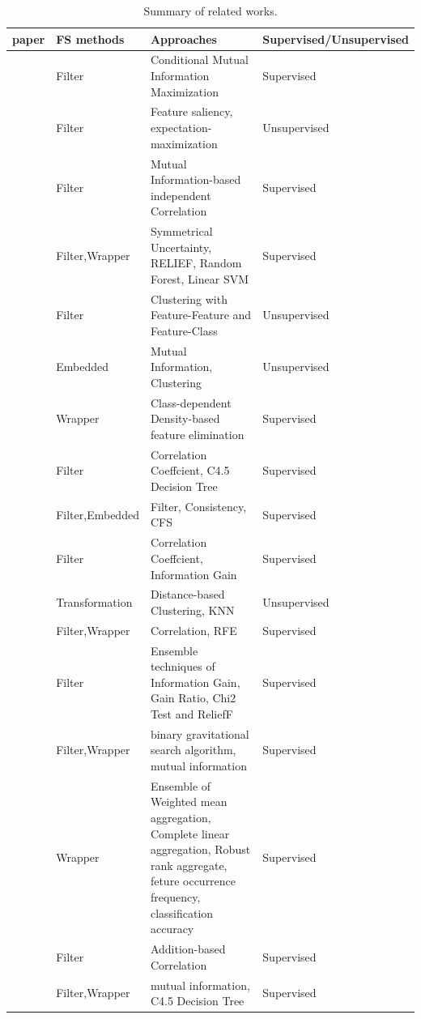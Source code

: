 \documentclass{ieeeaccess}
\theoremstyle{definition}
\begin{document}
\begin{table}[!htbp]
    \centering
    \caption{Summary of related works.}
        \begin{tabular}{p{3em}p{8em}p{20em}p{11em}}
        \toprule
        paper & FS methods & Approaches & Supervised/Unsupervised \\
        \midrule
        \cite{Fleuret2004} & Filter & Conditional Mutual Information Maximization & Supervised \\
        \cite{Law2004} & Filter & Feature saliency, expectation-maximization & Unsupervised \\
        \cite{Qu2005} & Filter & Mutual Information-based independent Correlation & Supervised \\
        \cite{Saeys2008} & Filter,\newline{}Wrapper & Symmetrical Uncertainty, RELIEF, Random Forest, Linear SVM & Supervised \\
        \cite{Hsu2010} & Filter & Clustering with Feature-Feature and Feature-Class & Unsupervised \\
        \cite{Liu2011} & Embedded & Mutual Information, Clustering & Unsupervised \\
        \cite{Javed2012} & Wrapper & Class-dependent Density-based feature elimination & Supervised \\
        \cite{Eid2013} & Filter & Correlation Coeffcient, C4.5 Decision Tree & Supervised \\
        \cite{Singh2015} & Filter,\newline{}Embedded & Filter, Consistency, CFS  & Supervised \\
        \cite{Wahba2015} & Filter & Correlation Coeffcient, Information Gain & Supervised \\
        \cite{CANN2015} & Transformation & Distance-based Clustering, KNN & Unsupervised \\
        \cite{Iglesias2015} & Filter,\newline{}Wrapper & Correlation, RFE & Supervised \\
        \cite{Osanaiye2016} & Filter & Ensemble techniques of Information Gain, Gain Ratio, Chi2 Test and ReliefF & Supervised \\
        \cite{Bostani2017} & Filter,\newline{}Wrapper & binary gravitational search algorithm, mutual information & Supervised \\
        \cite{Brahim2018} & Wrapper & Ensemble of Weighted mean aggregation, Complete linear aggregation, Robust rank aggregate, feture occurrence frequency, classification accuracy & Supervised \\
        \cite{CorrCorr2019} & Filter & Addition-based Correlation & Supervised \\
        \cite{Selvakumar2019} & Filter,\newline{}Wrapper & mutual information, C4.5 Decision Tree & Supervised \\
        \bottomrule
        \end{tabular}%
    \label{tab:related-works}%
\end{table}%
\end{document}
